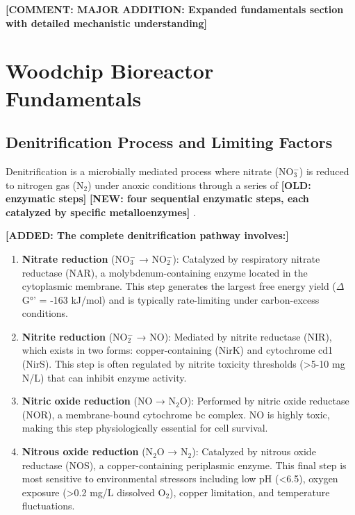 \documentclass[12pt,a4paper]{article}
\newcommand{\replaced}[2]{\textcolor{deletedtext}{\textbf{[OLD: #1]}} \textcolor{replacedtext}{\textbf{[NEW: #2]}}}
\newcommand{\comment}[1]{\textcolor{commenttext}{\textbf{[COMMENT: #1]}}}
\begin{document}
\comment{MAJOR ADDITION: Expanded fundamentals section with detailed mechanistic understanding}

\section{Woodchip Bioreactor Fundamentals}

\subsection{Denitrification Process and Limiting Factors}

Denitrification is a microbially mediated process where nitrate (NO$_{3}^{-}$) is reduced to nitrogen gas (N$_{2}$) under anoxic conditions through a series of \replaced{enzymatic steps}{four sequential enzymatic steps, each catalyzed by specific metalloenzymes} \citep{RN242, RN629}.

\textcolor{addedtext}{\textbf{[ADDED: The complete denitrification pathway involves:]}}

\begin{enumerate}
\item \textbf{Nitrate reduction} (NO$_{3}^{-}$ → NO$_{2}^{-}$): Catalyzed by respiratory nitrate reductase (NAR), a molybdenum-containing enzyme located in the cytoplasmic membrane. This step generates the largest free energy yield ($\Delta$G°' = -163 kJ/mol) and is typically rate-limiting under carbon-excess conditions.

\item \textbf{Nitrite reduction} (NO$_{2}^{-}$ → NO): Mediated by nitrite reductase (NIR), which exists in two forms: copper-containing (NirK) and cytochrome cd1 (NirS). This step is often regulated by nitrite toxicity thresholds (>5-10 mg N/L) that can inhibit enzyme activity.

\item \textbf{Nitric oxide reduction} (NO → N$_{2}$O): Performed by nitric oxide reductase (NOR), a membrane-bound cytochrome bc complex. NO is highly toxic, making this step physiologically essential for cell survival.

\item \textbf{Nitrous oxide reduction} (N$_{2}$O → N$_{2}$): Catalyzed by nitrous oxide reductase (NOS), a copper-containing periplasmic enzyme. This final step is most sensitive to environmental stressors including low pH (<6.5), oxygen exposure (>0.2 mg/L dissolved O$_2$), copper limitation, and temperature fluctuations.
\end{enumerate}
\end{document}
